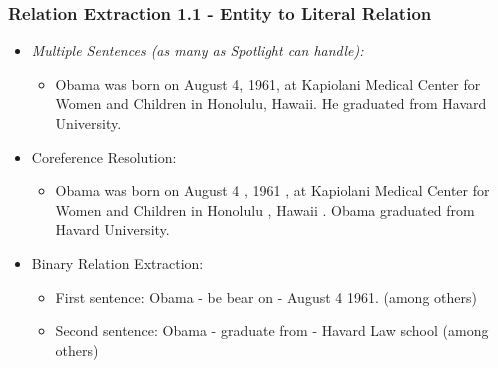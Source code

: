 \documentclass{beamer}
\begin{document}
\begin{frame}
\frametitle{Relation Extraction 1.1 - Entity to Literal Relation}
\begin{example}[]
	\begin{itemize}
		\item \textit{Multiple Sentences (as many as Spotlight can handle):} \\
		\begin{itemize} \item Obama was born on August 4, 1961, at Kapiolani Medical Center for Women and Children in Honolulu, Hawaii. He graduated from Havard University.
		\end{itemize}
		\item Coreference Resolution:  \begin{itemize} \item Obama was born on August 4 , 1961 , at Kapiolani Medical Center for Women and Children in Honolulu , Hawaii . Obama graduated from Havard University. 
		\end{itemize}
	\item Binary Relation Extraction:  \begin{itemize} \item First sentence: Obama - be bear on - August 4 1961. (among others)
    \item Second sentence: Obama - graduate from - Havard Law school (among others)
	\end{itemize}	 
	\end{itemize}
\end{example}
\end{frame}
\end{document}
